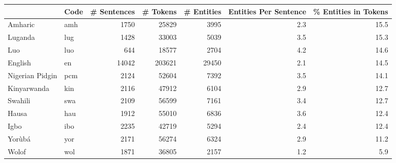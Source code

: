 \begin{tabular}{llrrrrr}
\toprule
{} & Code &  \# Sentences &  \# Tokens &  \# Entities &  Entities Per Sentence &  \% Entities in Tokens \\
\midrule
Amharic         &  amh &         1750 &     25829 &        3995 &                    2.3 &                  15.5 \\
Luganda         &  lug &         1428 &     33003 &        5039 &                    3.5 &                  15.3 \\
Luo             &  luo &          644 &     18577 &        2704 &                    4.2 &                  14.6 \\
English         &   en &        14042 &    203621 &       29450 &                    2.1 &                  14.5 \\
Nigerian Pidgin &  pcm &         2124 &     52604 &        7392 &                    3.5 &                  14.1 \\
Kinyarwanda     &  kin &         2116 &     47912 &        6104 &                    2.9 &                  12.7 \\
Swahili         &  swa &         2109 &     56599 &        7161 &                    3.4 &                  12.7 \\
Hausa           &  hau &         1912 &     55010 &        6836 &                    3.6 &                  12.4 \\
Igbo            &  ibo &         2235 &     42719 &        5294 &                    2.4 &                  12.4 \\
Yorùbá          &  yor &         2171 &     56274 &        6324 &                    2.9 &                  11.2 \\
Wolof           &  wol &         1871 &     36805 &        2157 &                    1.2 &                   5.9 \\
\bottomrule
\end{tabular}
